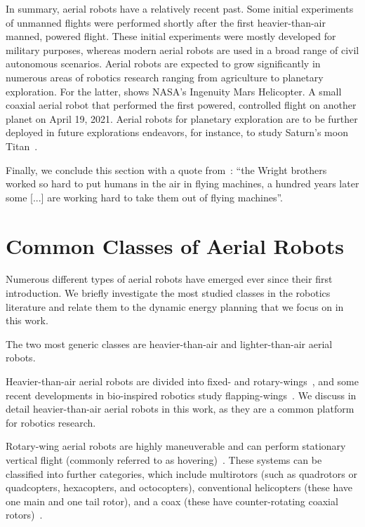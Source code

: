 In summary, aerial robots have a relatively recent past. Some initial experiments of unmanned flights were performed shortly after the first heavier-than-air manned, powered flight. These initial experiments were mostly developed for military purposes, whereas modern aerial robots are used in a broad range of civil autonomous scenarios. Aerial robots are expected to grow significantly in numerous areas of robotics research ranging from agriculture to planetary exploration. For the latter,  shows NASA's Ingenuity Mars Helicopter. A small coaxial aerial robot that performed the first powered, controlled flight on another planet on April 19, 2021. Aerial robots for planetary exploration are to be further deployed in future explorations endeavors, for instance, to study Saturn's moon Titan~\citep{voosen2019nasa}.

Finally, we conclude this section with a quote from~\citep{anderson2005introduction}: ``the Wright brothers worked so hard to put humans in the air in flying machines, a hundred years later some [...] are working hard to take them out of flying machines''.


\section{Common Classes of Aerial Robots}
\label{sec:aerial-robo-types}

Numerous different types of aerial robots have emerged ever since their first introduction. We briefly investigate the most studied classes in the robotics literature and relate them to the dynamic energy planning that we focus on in this work. 

The two most generic classes are heavier-than-air and lighter-than-air aerial robots.

Heavier-than-air aerial robots are divided into fixed- and rotary-wings~\citep{siciliano2016springer}, and some recent developments in bio-inspired robotics study flapping-wings~\citep{floreano2015science}. We discuss in detail heavier-than-air aerial robots in this work, as they are a common platform for robotics research. 

Rotary-wing aerial robots are highly maneuverable and can perform stationary vertical flight (commonly referred to as hovering)~\citep{siciliano2016springer}. These systems can be classified into further categories, which include multirotors (such as quadrotors or quadcopters, hexacopters, and octocopters), conventional helicopters (these have one main and one tail rotor), and a coax (these have counter-rotating coaxial rotors)~\citep{corke2017robotics}.


